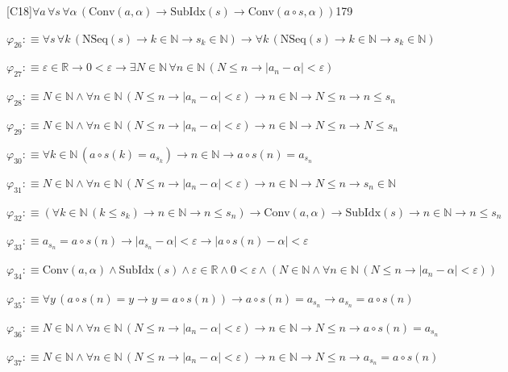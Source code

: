 \begin{fullproof}{[C18]}{$\forall a\,\forall s\,\forall \alpha\,(\mathrm{Conv}(a,\alpha) \to \mathrm{SubIdx}(s) \to \mathrm{Conv}(a \circ s,\alpha))$}{179}
\begin{abbrevlist}
\item $\varphi_{26} :\equiv \forall s\,\forall k\,(\mathrm{NSeq}(s) \to k \in \mathbb{N} \to s_{k} \in \mathbb{N}) \to \forall k\,(\mathrm{NSeq}(s) \to k \in \mathbb{N} \to s_{k} \in \mathbb{N})$
\item $\varphi_{27} :\equiv \varepsilon \in \mathbb{R} \to 0 < \varepsilon \to \exists N \in \mathbb{N}\,\forall n \in \mathbb{N}\,(N \leq n \to \lvert a_{n} - \alpha \rvert < \varepsilon)$
\item $\varphi_{28} :\equiv N \in \mathbb{N} \land \forall n \in \mathbb{N}\,(N \leq n \to \lvert a_{n} - \alpha \rvert < \varepsilon) \to n \in \mathbb{N} \to N \leq n \to n \leq s_{n}$
\item $\varphi_{29} :\equiv N \in \mathbb{N} \land \forall n \in \mathbb{N}\,(N \leq n \to \lvert a_{n} - \alpha \rvert < \varepsilon) \to n \in \mathbb{N} \to N \leq n \to N \leq s_{n}$
\item $\varphi_{30} :\equiv \forall k \in \mathbb{N}\,(a \circ s(k) = a_{s_{k}}) \to n \in \mathbb{N} \to a \circ s(n) = a_{s_{n}}$
\item $\varphi_{31} :\equiv N \in \mathbb{N} \land \forall n \in \mathbb{N}\,(N \leq n \to \lvert a_{n} - \alpha \rvert < \varepsilon) \to n \in \mathbb{N} \to N \leq n \to s_{n} \in \mathbb{N}$
\item $\varphi_{32} :\equiv (\forall k \in \mathbb{N}\,(k \leq s_{k}) \to n \in \mathbb{N} \to n \leq s_{n}) \to \mathrm{Conv}(a,\alpha) \to \mathrm{SubIdx}(s) \to n \in \mathbb{N} \to n \leq s_{n}$
\item $\varphi_{33} :\equiv a_{s_{n}} = a \circ s(n) \to \lvert a_{s_{n}} - \alpha \rvert < \varepsilon \to \lvert a \circ s(n) - \alpha \rvert < \varepsilon$
\item $\varphi_{34} :\equiv \mathrm{Conv}(a,\alpha) \land \mathrm{SubIdx}(s) \land \varepsilon \in \mathbb{R} \land 0 < \varepsilon \land (N \in \mathbb{N} \land \forall n \in \mathbb{N}\,(N \leq n \to \lvert a_{n} - \alpha \rvert < \varepsilon))$
\item $\varphi_{35} :\equiv \forall y\,(a \circ s(n) = y \to y = a \circ s(n)) \to a \circ s(n) = a_{s_{n}} \to a_{s_{n}} = a \circ s(n)$
\item $\varphi_{36} :\equiv N \in \mathbb{N} \land \forall n \in \mathbb{N}\,(N \leq n \to \lvert a_{n} - \alpha \rvert < \varepsilon) \to n \in \mathbb{N} \to N \leq n \to a \circ s(n) = a_{s_{n}}$
\item $\varphi_{37} :\equiv N \in \mathbb{N} \land \forall n \in \mathbb{N}\,(N \leq n \to \lvert a_{n} - \alpha \rvert < \varepsilon) \to n \in \mathbb{N} \to N \leq n \to a_{s_{n}} = a \circ s(n)$

\end{abbrevlist}
\end{fullproof}
